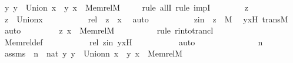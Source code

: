 \begin{isabellebody}
\ {\isachardoublequoteopen}{\isasymforall}y{\isachardot}{\kern0pt}\ y\ {\isasymin}\ Union{\isacharcircum}{\kern0pt}{}\ {\isacharparenleft}{\kern0pt}x{\isacharparenright}{\kern0pt}\ {\isasymlongrightarrow}\ {\isacharless}{\kern0pt}y{\isacharcomma}{\kern0pt}\ x{\isachargreater}{\kern0pt}\ {\isasymin}\ Memrel{\isacharparenleft}{\kern0pt}M{\isacharparenright}{\kern0pt}{\isacharcircum}{\kern0pt}{\isacharplus}{\kern0pt}{\isachardoublequoteclose}\isanewline
\ \ \ \ \isamarkupfalse%
{\isacharparenleft}{\kern0pt}rule\ allI{\isacharcomma}{\kern0pt}\ rule\ impI{\isacharparenright}{\kern0pt}\isanewline
\ \ \ \ \ \ \isamarkupfalse%
\ z\ \isamarkupfalse%
\ {\isachardoublequoteopen}z\ {\isasymin}\ Union{\isacharcircum}{\kern0pt}{}{\isacharparenleft}{\kern0pt}x{\isacharparenright}{\kern0pt}{\isachardoublequoteclose}\ \isanewline
\ \ \ \ \ \ \isamarkupfalse%
\ \isamarkupfalse%
\ rel\ {\isacharcolon}{\kern0pt}\ {\isachardoublequoteopen}z\ {\isasymin}\ x{\isachardoublequoteclose}\ \isamarkupfalse%
\ auto\ \isanewline
\ \ \ \ \ \ \isamarkupfalse%
\ \isamarkupfalse%
\ zin\ {\isacharcolon}{\kern0pt}\ {\isachardoublequoteopen}z\ {\isasymin}\ M{\isachardoublequoteclose}\ \isamarkupfalse%
\ yxH\ transM\ \isamarkupfalse%
\ auto\ \isanewline
\isanewline
\ \ \ \ \ \ \isamarkupfalse%
\ {\isachardoublequoteopen}{\isacharless}{\kern0pt}z{\isacharcomma}{\kern0pt}\ x{\isachargreater}{\kern0pt}\ {\isasymin}\ Memrel{\isacharparenleft}{\kern0pt}M{\isacharparenright}{\kern0pt}{\isacharcircum}{\kern0pt}{\isacharplus}{\kern0pt}{\isachardoublequoteclose}\ \isanewline
\ \ \ \ \ \ \ \ \isamarkupfalse%
{\isacharparenleft}{\kern0pt}rule\ r{\isacharunderscore}{\kern0pt}into{\isacharunderscore}{\kern0pt}trancl{\isacharparenright}{\kern0pt}\isanewline
\ \ \ \ \ \ \ \ \isamarkupfalse%
\ Memrel{\isacharunderscore}{\kern0pt}def\ \isanewline
\ \ \ \ \ \ \ \ \isamarkupfalse%
\ rel\ zin\ yxH\ \isanewline
\ \ \ \ \ \ \ \ \isamarkupfalse%
\ auto\isanewline
\ \ \ \ \isamarkupfalse%
\isanewline
\ \ \isamarkupfalse%
\ \isanewline
\ \ \ \ \isamarkupfalse%
\ n\ \isanewline
\ \ \ \ \isamarkupfalse%
\ assms{}\ {\isacharcolon}{\kern0pt}\ {\isachardoublequoteopen}n\ {\isasymin}\ nat{\isachardoublequoteclose}\ {\isachardoublequoteopen}{\isasymforall}y{\isachardot}{\kern0pt}\ y\ {\isasymin}\ Union{\isacharcircum}{\kern0pt}n\ {\isacharparenleft}{\kern0pt}x{\isacharparenright}{\kern0pt}\ {\isasymlongrightarrow}\ {\isasymlangle}y{\isacharcomma}{\kern0pt}\ x{\isasymrangle}\ {\isasymin}\ Memrel{\isacharparenleft}{\kern0pt}M{\isacharparenright}{\kern0pt}{\isacharcircum}{\kern0pt}{\isacharplus}{\kern0pt}{\isachardoublequoteclose}\isanewline

\end{isabellebody}

